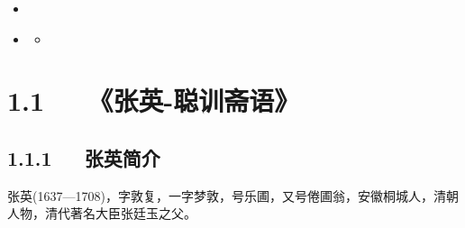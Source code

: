 \documentclass[letterpaper,12pt,english]{sphinxmanual}
\begin{document}
\begin{sphinxShadowBox}
\begin{itemize}
\begin{itemize}
\begin{itemize}
\item {} 
\label{\detokenize{p00_u5176_u5b83/_u300a_u5f20_u82f1-_u806a_u8bad_u658b_u8bed_u300b_u300a_u5f20_u5ef7_u7389-_u6f84_u6000_u56ed_u8bed_u300b_u5408_u8f91:id25}}{\hyperref[\detokenize{p00_u5176_u5b83/_u300a_u5f20_u82f1-_u806a_u8bad_u658b_u8bed_u300b_u300a_u5f20_u5ef7_u7389-_u6f84_u6000_u56ed_u8bed_u300b_u5408_u8f91:id12}]{}}

\item {} 
\label{\detokenize{p00_u5176_u5b83/_u300a_u5f20_u82f1-_u806a_u8bad_u658b_u8bed_u300b_u300a_u5f20_u5ef7_u7389-_u6f84_u6000_u56ed_u8bed_u300b_u5408_u8f91:id26}}{\hyperref[\detokenize{p00_u5176_u5b83/_u300a_u5f20_u82f1-_u806a_u8bad_u658b_u8bed_u300b_u300a_u5f20_u5ef7_u7389-_u6f84_u6000_u56ed_u8bed_u300b_u5408_u8f91:id13}]{}}
\begin{itemize}
\item {} 
\label{\detokenize{p00_u5176_u5b83/_u300a_u5f20_u82f1-_u806a_u8bad_u658b_u8bed_u300b_u300a_u5f20_u5ef7_u7389-_u6f84_u6000_u56ed_u8bed_u300b_u5408_u8f91:id27}}{\hyperref[\detokenize{p00_u5176_u5b83/_u300a_u5f20_u82f1-_u806a_u8bad_u658b_u8bed_u300b_u300a_u5f20_u5ef7_u7389-_u6f84_u6000_u56ed_u8bed_u300b_u5408_u8f91:id14}]{}}

\end{itemize}

\end{itemize}

\end{itemize}

\end{itemize}
\end{sphinxShadowBox}


\section{1.1   《张英-聪训斋语》}
\label{\detokenize{p00_u5176_u5b83/_u300a_u5f20_u82f1-_u806a_u8bad_u658b_u8bed_u300b_u300a_u5f20_u5ef7_u7389-_u6f84_u6000_u56ed_u8bed_u300b_u5408_u8f91:id3}}

\subsection{1.1.1   张英简介}
\label{\detokenize{p00_u5176_u5b83/_u300a_u5f20_u82f1-_u806a_u8bad_u658b_u8bed_u300b_u300a_u5f20_u5ef7_u7389-_u6f84_u6000_u56ed_u8bed_u300b_u5408_u8f91:id4}}
张英(1637—1708)，字敦复，一字梦敦，号乐圃，又号倦圃翁，安徽桐城人，清朝人物，清代著名大臣张廷玉之父。
\end{document}
